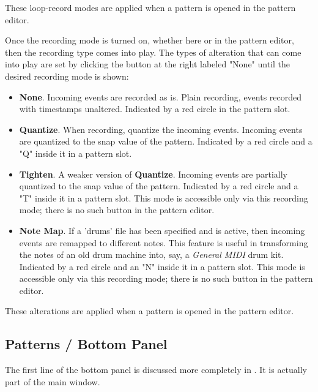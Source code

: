    These loop-record modes are applied when a pattern is opened
   in the pattern editor.

   Once the recording mode is turned on, whether here or in the pattern editor,
   then the recording type comes into play.
   The types of alteration that can come into play are set by clicking the
   button at the right labeled "None" until the desired recording mode
   is shown:

   \begin{itemize}
      \item \textbf{None}.
         Incoming events are recorded as is.
         Plain recording, events recorded with timestamps unaltered.
         Indicated by a red circle in the pattern slot.
      \item \textbf{Quantize}.
         When recording, quantize the incoming events.
         Incoming events are quantized to the snap value of the pattern.
         Indicated by a red circle and a "Q" inside it in a pattern slot.
      \item \textbf{Tighten}.
         A weaker version of \textbf{Quantize}.
         Incoming events are partially quantized to the snap value of the
         pattern.
         Indicated by a red circle and a "T" inside it in a pattern slot.
         This mode is accessible only via this recording mode; there
         is no such button in the pattern editor.
      \item \textbf{Note Map}.
         If a 'drums' file has been specified and is active, then
         incoming events are remapped to different notes.
         This feature is useful in transforming the notes of an old
         drum machine into, say, a \textsl{General MIDI} drum kit.
         Indicated by a red circle and an "N" inside it in a pattern slot.
         This mode is accessible only via this recording mode; there
         is no such button in the pattern editor.
   \end{itemize}

   These alterations are applied when a pattern is opened
   in the pattern editor.

\subsection{Patterns / Bottom Panel}
\label{subsec:patterns_panel_bottom}

   The first line of the bottom panel is discussed more completely in
   .
   It is actually part of the main window.

